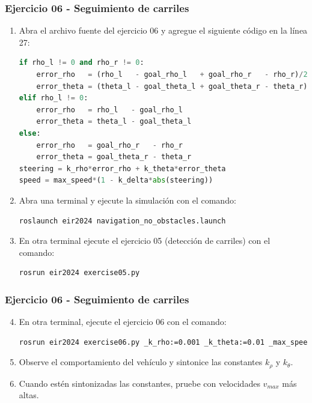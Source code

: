 \begin{frame}[containsverbatim]\frametitle{Ejercicio 06 - Seguimiento de carriles}
  \begin{enumerate}
  \item Abra el archivo fuente del ejercicio 06 y agregue el siguiente código en la línea 27:
    \begin{lstlisting}[language=Python, firstnumber=27]
if rho_l != 0 and rho_r != 0:
    error_rho   = (rho_l   - goal_rho_l   + goal_rho_r   - rho_r)/2
    error_theta = (theta_l - goal_theta_l + goal_theta_r - theta_r)/2
elif rho_l != 0:
    error_rho   = rho_l   - goal_rho_l  
    error_theta = theta_l - goal_theta_l
else:
    error_rho   = goal_rho_r   - rho_r  
    error_theta = goal_theta_r - theta_r
steering = k_rho*error_rho + k_theta*error_theta
speed = max_speed*(1 - k_delta*abs(steering))
    \end{lstlisting}
  \item Abra una terminal y ejecute la simulación con el comando:
    \begin{lstlisting}[language=bash,numbers=none]
roslaunch eir2024 navigation_no_obstacles.launch
    \end{lstlisting}
  \item En otra terminal ejecute el ejercicio 05 (detección de carriles) con el comando:
    \begin{lstlisting}[language=bash,numbers=none]
rosrun eir2024 exercise05.py 
    \end{lstlisting}
  \end{enumerate}
\end{frame}

\begin{frame}[containsverbatim]\frametitle{Ejercicio 06 - Seguimiento de carriles}
  \begin{enumerate}
    \setcounter{enumi}{3}
  \item En otra terminal, ejecute el ejercicio 06 con el comando:
    \begin{lstlisting}[language=bash,numbers=none]
rosrun eir2024 exercise06.py _k_rho:=0.001 _k_theta:=0.01 _max_speed:=20
    \end{lstlisting}
  \item Observe el comportamiento del vehículo y sintonice las constantes $k_\rho$ y $k_\theta$.
  \item Cuando estén sintonizadas las constantes, pruebe con velocidades $v_{max}$ más altas.
  \end{enumerate}
\end{frame}